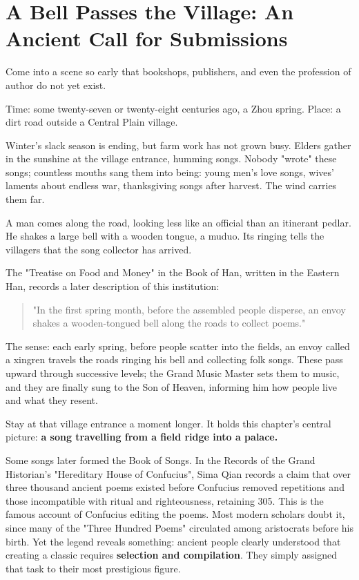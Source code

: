 \section[A Bell and an Ancient Call for Songs]{A Bell Passes the Village: An Ancient Call for Submissions}
Come into a scene so early that bookshops, publishers, and even the profession of author do not yet exist.

Time: some twenty-seven or twenty-eight centuries ago, a Zhou spring. Place: a dirt road outside a Central Plain village.

Winter's slack season is ending, but farm work has not grown busy. Elders gather in the sunshine at the village entrance, humming songs. Nobody "wrote" these songs; countless mouths sang them into being: young men's love songs, wives' laments about endless war, thanksgiving songs after harvest. The wind carries them far.

A man comes along the road, looking less like an official than an itinerant pedlar. He shakes a large bell with a wooden tongue, a muduo. Its ringing tells the villagers that the song collector has arrived.

The "Treatise on Food and Money" in the Book of Han, written in the Eastern Han, records a later description of this institution:

\begin{quote}
"In the first spring month, before the assembled people disperse, an envoy shakes a wooden-tongued bell along the roads to collect poems."
\end{quote}
The sense: each early spring, before people scatter into the fields, an envoy called a xingren travels the roads ringing his bell and collecting folk songs. These pass upward through successive levels; the Grand Music Master sets them to music, and they are finally sung to the Son of Heaven, informing him how people live and what they resent.

Stay at that village entrance a moment longer. It holds this chapter's central picture: \textbf{a song travelling from a field ridge into a palace.}

Some songs later formed the Book of Songs. In the Records of the Grand Historian's "Hereditary House of Confucius", Sima Qian records a claim that over three thousand ancient poems existed before Confucius removed repetitions and those incompatible with ritual and righteousness, retaining 305. This is the famous account of Confucius editing the poems. Most modern scholars doubt it, since many of the "Three Hundred Poems" circulated among aristocrats before his birth. Yet the legend reveals something: ancient people clearly understood that creating a classic requires \textbf{selection and compilation}. They simply assigned that task to their most prestigious figure.

